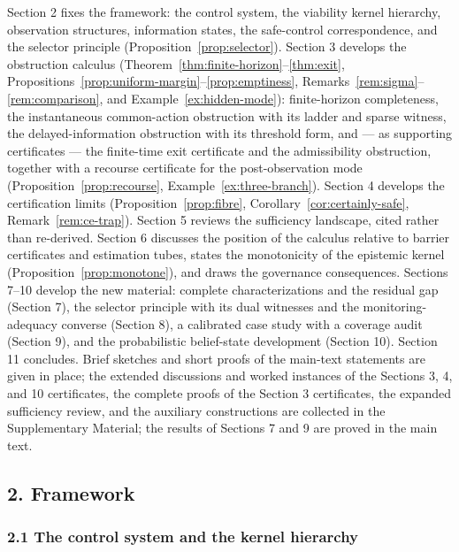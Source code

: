 \documentclass[10pt,twocolumn]{article}
\theoremstyle{definition}
\begin{document}
Section 2 fixes the framework: the control system, the viability kernel
hierarchy, observation structures, information states, the safe-control
correspondence, and the selector principle (Proposition~\ref{prop:selector}). Section 3 develops the obstruction calculus (Theorem~\ref{thm:finite-horizon}--\ref{thm:exit}, Propositions~\ref{prop:uniform-margin}--\ref{prop:emptiness}, Remarks~\ref{rem:sigma}--\ref{rem:comparison}, and Example~\ref{ex:hidden-mode}): finite-horizon completeness, the instantaneous common-action obstruction with its ladder and sparse witness, the delayed-information obstruction with its threshold form, and --- as supporting certificates --- the finite-time exit certificate and the admissibility obstruction, together with a recourse certificate for the post-observation mode (Proposition~\ref{prop:recourse}, Example~\ref{ex:three-branch}). Section 4 develops the certification limits
(Proposition~\ref{prop:fibre}, Corollary~\ref{cor:certainly-safe}, Remark~\ref{rem:ce-trap}). Section 5 reviews the sufficiency landscape, cited rather than re-derived. Section
6 discusses the position of the calculus relative to barrier
certificates and estimation tubes, states the monotonicity of the
epistemic kernel (Proposition~\ref{prop:monotone}), and draws the governance
consequences. Sections 7--10 develop the new material: complete characterizations and the residual gap (Section 7), the selector principle with its dual witnesses and the monitoring-adequacy converse (Section 8), a calibrated case study with a coverage audit (Section 9), and the probabilistic belief-state development (Section 10). Section 11 concludes. Brief sketches and short proofs of the main-text statements are given in place; the extended discussions and worked instances of the Sections 3, 4, and 10 certificates, the complete proofs of the Section 3 certificates, the expanded sufficiency review, and the auxiliary constructions are collected in the Supplementary Material; the results of Sections 7 and 9 are proved in the main text.



\subsection{2. Framework}\label{framework}

\subsubsection{2.1 The control system and the kernel
hierarchy}\label{the-control-system-and-the-kernel-hierarchy}
\end{document}

